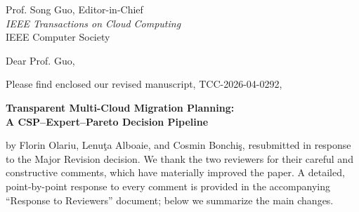 \documentclass[12pt,a4paper]{letter}
\date{September 2026}
\begin{document}
\begin{letter}{
  Prof. Song Guo, Editor-in-Chief \\
  \textit{IEEE Transactions on Cloud Computing} \\
  IEEE Computer Society
}

\opening{Dear Prof. Guo,}

Please find enclosed our revised manuscript, TCC-2026-04-0292,

\begin{center}
  \textbf{Transparent Multi-Cloud Migration Planning:\\
  A CSP--Expert--Pareto Decision Pipeline}
\end{center}

\noindent
by Florin Olariu, Lenu\c{t}a Alboaie, and Cosmin Bonchi\c{s}, resubmitted in
response to the Major Revision decision. We thank the two reviewers for
their careful and constructive comments, which have materially improved the
paper. A detailed, point-by-point response to every comment is provided in
the accompanying ``Response to Reviewers'' document; below we summarize the
main changes.


\end{letter}
\end{document}
